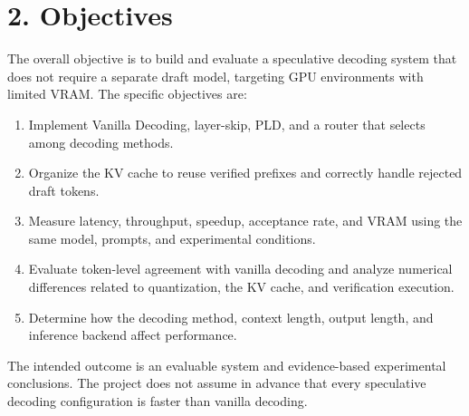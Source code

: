 \section*{2. Objectives}
The overall objective is to build and evaluate a speculative decoding system that does not require a separate draft model, targeting GPU environments with limited VRAM. The specific objectives are:
\begin{enumerate}
    \item Implement Vanilla Decoding, layer-skip, PLD, and a router that selects among decoding methods.
    \item Organize the KV cache to reuse verified prefixes and correctly handle rejected draft tokens.
    \item Measure latency, throughput, speedup, acceptance rate, and VRAM using the same model, prompts, and experimental conditions.
    \item Evaluate token-level agreement with vanilla decoding and analyze numerical differences related to quantization, the KV cache, and verification execution.
    \item Determine how the decoding method, context length, output length, and inference backend affect performance.
\end{enumerate}
The intended outcome is an evaluable system and evidence-based experimental conclusions. The project does not assume in advance that every speculative decoding configuration is faster than vanilla decoding.

